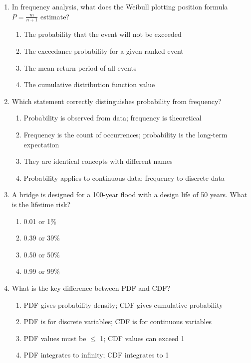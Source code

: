 \documentclass[11pt,a4paper]{article}
\begin{document}
\begin{enumerate}

\item In frequency analysis, what does the Weibull plotting position formula $P = \frac{m}{n+1}$ estimate?
\begin{enumerate}[label=\Alph*)]
    \item The probability that the event will not be exceeded
    \item The exceedance probability for a given ranked event
    \item The mean return period of all events
    \item The cumulative distribution function value
\end{enumerate}

\item Which statement correctly distinguishes probability from frequency?
\begin{enumerate}[label=\Alph*)]
    \item Probability is observed from data; frequency is theoretical
    \item Frequency is the count of occurrences; probability is the long-term expectation
    \item They are identical concepts with different names
    \item Probability applies to continuous data; frequency to discrete data
\end{enumerate}

\item A bridge is designed for a 100-year flood with a design life of 50 years. What is the lifetime risk?
\begin{enumerate}[label=\Alph*)]
    \item 0.01 or 1\%
    \item 0.39 or 39\%
    \item 0.50 or 50\%
    \item 0.99 or 99\%
\end{enumerate}

\item What is the key difference between PDF and CDF?
\begin{enumerate}[label=\Alph*)]
    \item PDF gives probability density; CDF gives cumulative probability
    \item PDF is for discrete variables; CDF is for continuous variables
    \item PDF values must be $\leq$ 1; CDF values can exceed 1
    \item PDF integrates to infinity; CDF integrates to 1
\end{enumerate}


\end{enumerate}
\end{document}
